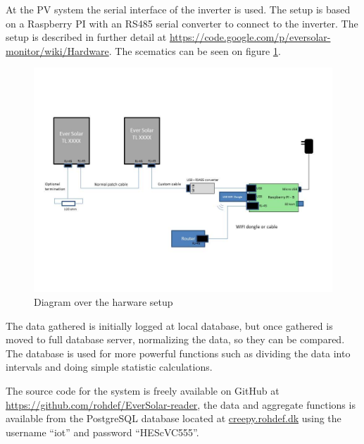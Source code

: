 At the PV system the serial interface of the inverter is used.  The
setup is based on a Raspberry PI with an RS485 serial converter to
connect to the inverter.  The setup is described in further detail at
\url{https://code.google.com/p/eversolar-monitor/wiki/Hardware}.  The
scematics can be seen on figure \ref{fig:hardware}.

\begin{figure}[h]
  \centering
  \includegraphics[width=1\textwidth]{hardware}
  \caption{Diagram over the harware setup}
  \label{fig:hardware}
\end{figure}

The data gathered is initially logged at local database, but once
gathered is moved to full database server, normalizing the data, so
they can be compared.  The database is used for more powerful
functions such as dividing the data into intervals and doing simple
statistic calculations.

The source code for the system is freely available on GitHub at
\url{https://github.com/rohdef/EverSolar-reader}, the data and
aggregate functions is available from the PostgreSQL database located
at \url{creepy.rohdef.dk} using the username ``iot'' and password
``HEScVC555''.

